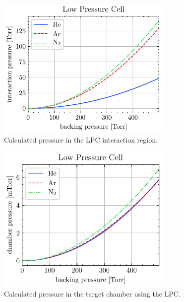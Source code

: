 \begin{figure}
	\centering
	\includegraphics[width=0.75\textwidth]{figures/chap3/LPC_interaction_p.pdf}
	\caption{Calculated pressure in the LPC interaction region.}
	\label{fig:LPC_interaction_p}
\end{figure}

\begin{figure}
	\centering
	\includegraphics[width=0.75\textwidth]{figures/chap3/LPC_chamber_p.pdf}
	\caption{Calculated pressure in the target chamber using the LPC.}
	\label{fig:LPC_chamber_p}
\end{figure}

